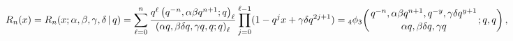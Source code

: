 \[R_{n}(x)=\mathop{R_{n}\/}\nolimits\!\left(x;\alpha,\beta,\gamma,\delta\,|\,q%
\right)=\sum_{\ell=0}^{n}\frac{q^{\ell}\left(q^{-n},\alpha\beta q^{n+1};q%
\right)_{\ell}}{\left(\alpha q,\beta\delta q,\gamma q,q;q\right)_{\ell}}\*%
\prod_{j=0}^{\ell-1}(1-q^{j}x+\gamma\delta q^{2j+1})=\mathop{{{}_{4}\phi_{3}}%
\/}\nolimits\!\left({q^{-n},\alpha\beta q^{n+1},q^{-y},\gamma\delta q^{y+1}%
\atop\alpha q,\beta\delta q,\gamma q};q,q\right),\]